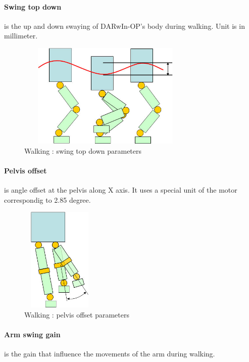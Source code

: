 \documentclass[a4paper, 12pt]{article}  		%
\begin{document}
\paragraph*{Swing top down}
is the up and down swaying of DARwIn-OP's body during walking. Unit is in millimeter.
\begin{figure}[H]
\begin{center}
\includegraphics[height=5cm, width=8.5cm]{swing_top_down.jpg}
\caption{Walking : swing top down parameters}
\label{swing_top_down}
\end{center}
\end{figure}

\paragraph*{Pelvis offset}
is angle offset at the pelvis along X axis. It uses a special unit of the motor correspondig to 2.85 degree.
\begin{figure}[H]
\begin{center}
\includegraphics[height=5cm, width=3.7cm]{pelvis_offset.jpg}
\caption{Walking : pelvis offset parameters}
\label{pelvis_offset}
\end{center}
\end{figure}

\paragraph*{Arm swing gain}
is the gain that influence the movements of the arm during walking.
\end{document}
